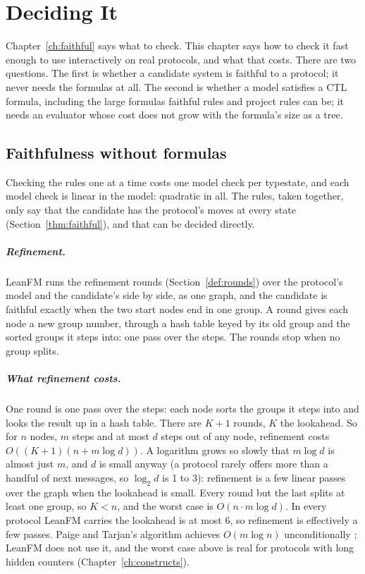 \chapter{Deciding It}\label{ch:deciding}

Chapter~\ref{ch:faithful} says what to check. This chapter says how to check it fast
enough to use interactively on real protocols, and what that costs. There are two
questions. The first is whether a candidate system is faithful to a protocol; it never
needs the formulas at all. The second is whether a model satisfies a CTL formula,
including the large formulas faithful rules and project rules can be; it needs an
evaluator whose cost does not grow with the formula's size as a tree.

\section{Faithfulness without formulas}

Checking the rules one at a time costs one model check per typestate, and each model
check is linear in the model: quadratic in all. The rules, taken together, only say
that the candidate has the protocol's moves at every state (Section~\ref{thm:faithful}), and
that can be decided directly.

\paragraph{Refinement.} LeanFM runs the refinement rounds (Section~\ref{def:rounds}) over
the protocol's model and the candidate's side by side, as one graph, and the candidate is
faithful exactly when the two start nodes end in one group. A round gives each node a new group number,
through a hash table keyed by its old group and the sorted groups it steps into: one pass
over the steps. The rounds stop when no group splits.

\paragraph{What refinement costs.}\label{prop:refine} One round is one pass over the
steps: each node sorts the groups it steps into and looks the result up in a hash table.
There are $K+1$ rounds, $K$ the lookahead. So for $n$ nodes, $m$ steps and at most $d$
steps out of any node, refinement costs $O((K+1)(n + m\log d))$. A logarithm grows so slowly that $m\log d$
is almost just $m$, and $d$ is small anyway (a protocol rarely offers more than a handful
of next messages, so $\log_2 d$ is 1 to 3): refinement is a few linear passes over the
graph when the lookahead is small. Every round but the last splits at least one group, so
$K < n$, and the worst case is $O(n \cdot m\log d)$.
In every protocol LeanFM carries the lookahead is at most $6$, so refinement is effectively
a few passes. Paige
and Tarjan's algorithm achieves $O(m \log n)$ unconditionally
\citep{paige1987three}; LeanFM does not use it, and the worst case above is real for
protocols with long hidden counters (Chapter~\ref{ch:constructs}).


